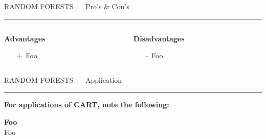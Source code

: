 \documentclass[11pt,compress,t,notes=noshow, xcolor=table]{beamer}
\begin{document}

\LARGE
\begin{frame}{\textcolor{gray!80}{RANDOM FORESTS} ~~ Pro's \& Con's}
\normalsize
\vspace{-0.5cm}
\noindent \textcolor{gray!80}{\rule{\textwidth}{1pt}}

\vspace{0.3cm}

\begin{columns}[onlytextwidth]
  \begin{column}{0.5\textwidth}
    \textbf{\textcolor{gray!80}{Advantages}}
    \footnotesize
    \begin{itemize}
      \item[$\textbf{\textcolor{gray!80}{+}}$] Foo
    \end{itemize}
  \end{column}
  \begin{column}{0.5\textwidth}
    \textbf{\textcolor{gray!80}{Disadvantages}}
    \footnotesize
    \begin{itemize}
      \item[$\textbf{\textcolor{gray!80}{-}}$] Foo
    \end{itemize}
  \end{column}
\end{columns}

\vfill

\small


\end{frame}


\LARGE
\begin{frame}{\textcolor{gray!80}{RANDOM FORESTS} ~~ Application}
\normalsize
\vspace{-0.5cm}
\noindent \textcolor{gray!80}{\rule{\textwidth}{1pt}}

\vspace{0.3cm}

\textbf{For applications of CART, note the following:}
\lz

\textbf{\textcolor{gray!80}{Foo}} \\
\smallskip
Foo \\
\smallskip

\end{frame}


\endlecture
\end{document}
